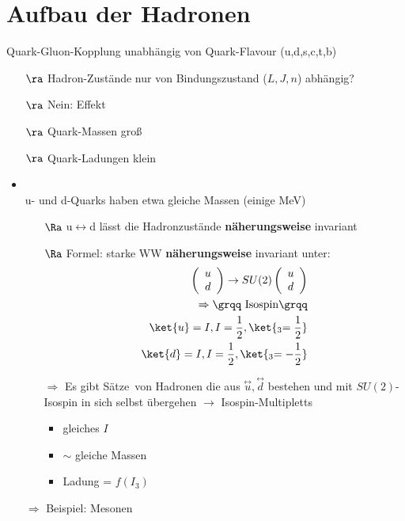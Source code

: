 
\section{Aufbau der Hadronen}
Quark-Gluon-Kopplung unabhängig von Quark-Flavour (u,d,s,c,t,b)
\begin{itemize}
\item[$\ra$] Hadron-Zustände nur von Bindungszustand ($L,J,n$) abhängig?
\item[$\ra$] Nein:            Effekt
\item[$\ra$] Quark-Massen     groß
\item[$\ra$] Quark-Ladungen   klein
\item {}\\
u- und d-Quarks haben etwa gleiche Massen (einige MeV)
\begin{itemize}
\item[$\Ra$]u$\leftrightarrow$d lässt die Hadronzustände \textbf{näherungsweise} invariant
\item[$\Ra$] Formel: starke WW \textbf{näherungsweise} invariant unter:
\begin{align*}
\left(\begin{array}{c}u\\d\end{array}\right)\rightarrow SU(2)\left(\begin{array}{c}u\\d\end{array}\right)\\
\Rightarrow \text{\grqq Isospin\grqq}\\
\ket{u}=I, I=\frac{1}{2}, \ket{_3=\frac{1}{2}}\\
\ket{d}=I, I=\frac{1}{2}, \ket{_3=-\frac{1}{2}}
\end{align*}
\item[$\Rightarrow$] Es gibt \grqq Sätze\grqq\ von Hadronen die aus $\stackrel{\leftrightarrow}{u},\stackrel{\leftrightarrow}{d}$ bestehen und mit $SU(2)$-Isospin in  sich selbst übergehen $\rightarrow$ \grqq Isospin-Multipletts\grqq
\begin{itemize}
\item gleiches $I$
\item $\sim$ gleiche Massen
\item Ladung = $f(I_3)$
\end{itemize}
\end{itemize}
$\Rightarrow$ Beispiel: Mesonen


\end{itemize}
